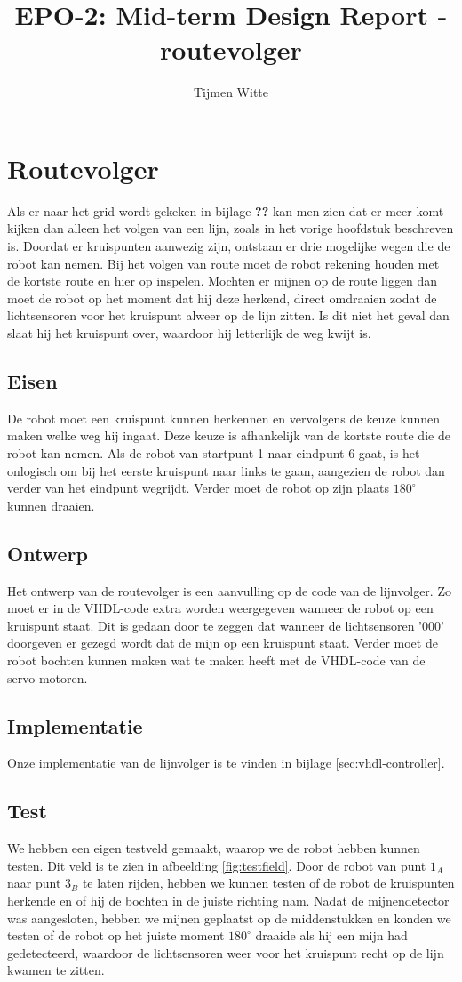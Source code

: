 \documentclass{report}
\title{EPO-2: Mid-term Design Report - routevolger}
\author{Tijmen Witte}
\begin{document}
\chapter{Routevolger}
\label{ch:probleem}

Als er naar het grid wordt gekeken in bijlage \textbf{??} kan men zien dat er meer komt kijken dan alleen het volgen van een lijn, zoals in het vorige hoofdstuk beschreven is. Doordat er kruispunten aanwezig zijn, ontstaan er drie mogelijke wegen die de robot kan nemen. Bij het volgen van route moet de robot rekening houden met de kortste route en hier op inspelen. Mochten er mijnen op de route liggen dan moet de robot op het moment dat hij deze herkend, direct omdraaien zodat de lichtsensoren voor het kruispunt alweer op de lijn zitten. Is dit niet het geval dan slaat hij het kruispunt over, waardoor hij letterlijk de weg kwijt is.

\section{Eisen}
De robot moet een kruispunt kunnen herkennen en vervolgens de keuze kunnen maken welke weg hij ingaat. Deze keuze is afhankelijk van de kortste route die de robot kan nemen. Als de robot van startpunt 1 naar eindpunt 6 gaat, is het onlogisch om bij het eerste kruispunt naar links te gaan, aangezien de robot dan verder van het eindpunt wegrijdt. Verder moet de robot op zijn plaats $180^\circ$ kunnen draaien.

\section{Ontwerp}
Het ontwerp van de routevolger is een aanvulling op de code van de lijnvolger. Zo moet er in de VHDL-code extra worden weergegeven wanneer de robot op een kruispunt staat. Dit is gedaan door te zeggen dat wanneer de lichtsensoren '000' doorgeven er gezegd wordt dat de mijn op een kruispunt staat. Verder moet de robot bochten kunnen maken wat te maken heeft met de VHDL-code van de servo-motoren.

\section{Implementatie}
Onze implementatie van de lijnvolger is te vinden in bijlage \ref{sec:vhdl-controller}.

\section{Test}
We hebben een eigen testveld gemaakt, waarop we de robot hebben kunnen testen. Dit veld is te zien in afbeelding \ref{fig:testfield}. Door de robot van punt $1_A$ naar punt $3_B$ te laten rijden, hebben we kunnen testen of de robot de kruispunten herkende en of hij de bochten in de juiste richting nam. Nadat de mijnendetector was aangesloten, hebben we mijnen geplaatst op de middenstukken en konden we testen of de robot op het juiste moment $180^\circ$ draaide als hij een mijn had gedetecteerd, waardoor de lichtsensoren weer voor het kruispunt  recht op de lijn kwamen te zitten.
\end{document}

